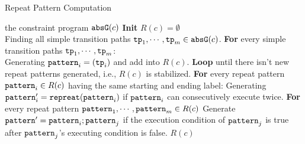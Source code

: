 \begin{algorithm}
\caption{
{Repeat Pattern Computation}
\label{alg:repeat-pattern}
}
\begin{algorithmic}[1]
\REQUIRE the constraint program $\mathtt{abs}{\mathtt{G}}(c)$
\STATE  \textbf{Init} $R(c) = \emptyset$
\\
\qquad Finding all simple transition paths $ \mathtt{tp}_1, \cdots, \mathtt{tp}_m \in \mathtt{abs}{\mathtt{G}}(c)$.
\STATE  
\textbf{For} every simple transition paths $\mathtt{tp}_1, \cdots, \mathtt{tp}_m$:
\\
\quad Generating
$\mathtt{pattern}_{i} = (\mathtt{tp}_i)$ and add into $R(c)$.
\STATE  \textbf{Loop} until there isn't new repeat patterns generated, i.e., $R(c)$ is stabilized.
\STATE  \quad \textbf{For} every repeat pattern $\mathtt{pattern}_i \in R(c)$ having the same starting and ending label:
\STATE  \quad \quad Generating $\mathtt{pattern}_{i}' = \mathtt{repreat}(\mathtt{pattern}_i)$ if $\mathtt{pattern}_i$ can consecutively execute twice.
\STATE  \quad \textbf{For} every repeat pattern $\mathtt{pattern}_1, \cdots, \mathtt{pattern}_m \in R(c)$
\STATE \quad \quad  Generate $\mathtt{pattern}' = \mathtt{pattern}_{i}; \mathtt{pattern}_{j} $ 
if the execution condition of $\mathtt{pattern}_{j}$
is true after $\mathtt{pattern}_{j}$'s executing condition is false.
\RETURN $R(c)$
\end{algorithmic}
\end{algorithm}
